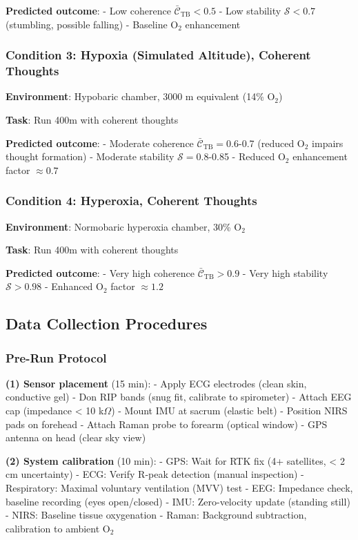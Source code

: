 \documentclass[11pt,onecolumn]{article}
\begin{document}
\textbf{Predicted outcome}:
- Low coherence $\bar{\mathcal{C}}_{\text{TB}} < 0.5$
- Low stability $\mathcal{S} < 0.7$ (stumbling, possible falling)
- Baseline O$_2$ enhancement

\subsubsection{Condition 3: Hypoxia (Simulated Altitude), Coherent Thoughts}

\textbf{Environment}: Hypobaric chamber, 3000 m equivalent (14\% O$_2$)

\textbf{Task}: Run 400m with coherent thoughts

\textbf{Predicted outcome}:
- Moderate coherence $\bar{\mathcal{C}}_{\text{TB}} = 0.6$-0.7 (reduced O$_2$ impairs thought formation)
- Moderate stability $\mathcal{S} = 0.8$-0.85
- Reduced O$_2$ enhancement factor $\approx 0.7$

\subsubsection{Condition 4: Hyperoxia, Coherent Thoughts}

\textbf{Environment}: Normobaric hyperoxia chamber, 30\% O$_2$

\textbf{Task}: Run 400m with coherent thoughts

\textbf{Predicted outcome}:
- Very high coherence $\bar{\mathcal{C}}_{\text{TB}} > 0.9$
- Very high stability $\mathcal{S} > 0.98$
- Enhanced O$_2$ factor $\approx 1.2$

\subsection{Data Collection Procedures}

\subsubsection{Pre-Run Protocol}

\textbf{(1) Sensor placement} (15 min):
- Apply ECG electrodes (clean skin, conductive gel)
- Don RIP bands (snug fit, calibrate to spirometer)
- Attach EEG cap (impedance < 10 k$\Omega$)
- Mount IMU at sacrum (elastic belt)
- Position NIRS pads on forehead
- Attach Raman probe to forearm (optical window)
- GPS antenna on head (clear sky view)

\textbf{(2) System calibration} (10 min):
- GPS: Wait for RTK fix (4+ satellites, < 2 cm uncertainty)
- ECG: Verify R-peak detection (manual inspection)
- Respiratory: Maximal voluntary ventilation (MVV) test
- EEG: Impedance check, baseline recording (eyes open/closed)
- IMU: Zero-velocity update (standing still)
- NIRS: Baseline tissue oxygenation
- Raman: Background subtraction, calibration to ambient O$_2$
\end{document}
